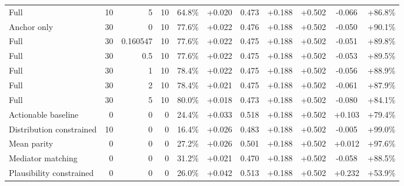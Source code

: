 \begin{table}[htbp]
\begin{tabular}{lrrrccccccc}
Full & 10 & 5 & 10 & 64.8\% & +0.020 & 0.473 & +0.188 & +0.502 & -0.066 & +86.8\% \\
Anchor only & 30 & 0 & 10 & 77.6\% & +0.022 & 0.476 & +0.188 & +0.502 & -0.050 & +90.1\% \\
Full & 30 & 0.160547 & 10 & 77.6\% & +0.022 & 0.475 & +0.188 & +0.502 & -0.051 & +89.8\% \\
Full & 30 & 0.5 & 10 & 77.6\% & +0.022 & 0.475 & +0.188 & +0.502 & -0.053 & +89.5\% \\
Full & 30 & 1 & 10 & 78.4\% & +0.022 & 0.475 & +0.188 & +0.502 & -0.056 & +88.9\% \\
Full & 30 & 2 & 10 & 78.4\% & +0.021 & 0.475 & +0.188 & +0.502 & -0.061 & +87.9\% \\
Full & 30 & 5 & 10 & 80.0\% & +0.018 & 0.473 & +0.188 & +0.502 & -0.080 & +84.1\% \\
Actionable baseline & 0 & 0 & 0 & 24.4\% & +0.033 & 0.518 & +0.188 & +0.502 & +0.103 & +79.4\% \\
Distribution constrained & 10 & 0 & 0 & 16.4\% & +0.026 & 0.483 & +0.188 & +0.502 & -0.005 & +99.0\% \\
Mean parity & 0 & 0 & 0 & 27.2\% & +0.026 & 0.501 & +0.188 & +0.502 & +0.012 & +97.6\% \\
Mediator matching & 0 & 0 & 0 & 31.2\% & +0.021 & 0.470 & +0.188 & +0.502 & -0.058 & +88.5\% \\
Plausibility constrained & 0 & 0 & 0 & 26.0\% & +0.042 & 0.513 & +0.188 & +0.502 & +0.232 & +53.9\% \\
\bottomrule
\end{tabular}
\end{table}